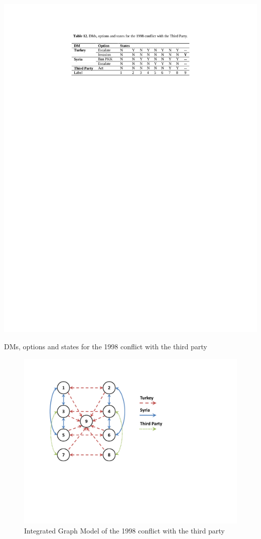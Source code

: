 \documentclass[letterpaper,12pt,titlepage,oneside,final]{book}
\begin{document}
\begin{table}[H]
\centering
\includegraphics[scale=1]{PDF-IMG/tables/12.pdf}

\caption{DMs, options and states for the 1998 conflict with the third party}

\label{tbl:t12}
\end{table}

\begin{center}
\begin{figure}[H]
\centering
\includegraphics[scale=0.6]{PDF-IMG/SyTrEg.pdf}

\caption{Integrated Graph Model of the 1998 conflict with the third party}

\label{fig:SyTrGM}
\end{figure}
\end{center}
\end{document}
